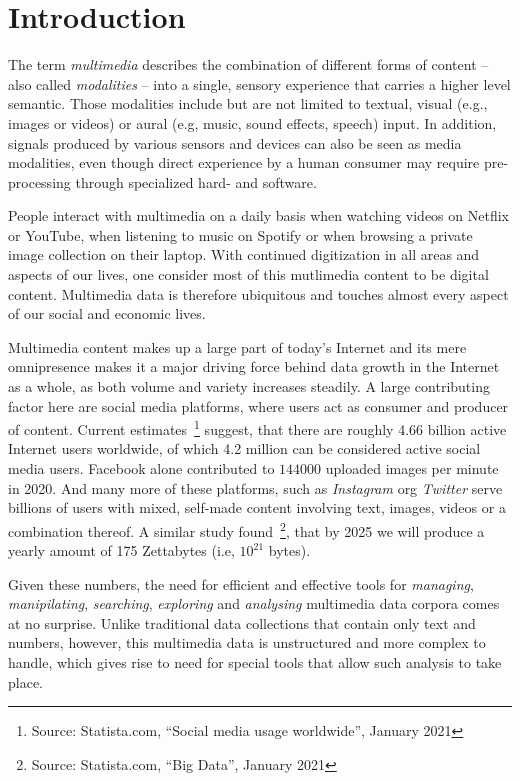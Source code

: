 \chapter{Introduction}
The term \emph{multimedia} describes the combination of different forms of content -- also called \emph{modalities} -- into a single, sensory experience that carries a higher level semantic. Those modalities include but are not limited to textual, visual (e.g., images or videos) or aural (e.g, music, sound effects, speech) input. In addition, signals produced by various sensors and devices can also be seen as media modalities, even though direct experience by a human consumer may require pre-processing through specialized hard- and software.

People interact with multimedia on a daily basis when watching videos on Netflix or YouTube, when listening to music on Spotify or when browsing a private image collection on their laptop. With continued digitization in all areas and aspects of our lives, one consider most of this mutlimedia content to be digital content. Multimedia data is therefore ubiquitous and touches almost every aspect of our social and economic lives. 

Multimedia content makes up a large part of today's Internet and its mere omnipresence makes it a major driving force behind data growth in the Internet as a whole, as both volume and variety increases steadily. A large contributing factor here are social media platforms, where users act as consumer and producer of content. Current estimates~\footnote{Source: Statista.com, ``Social media usage worldwide'', January 2021} suggest, that there are roughly 4.66 billion active Internet users worldwide, of which 4.2 million can be considered active social media users. Facebook alone contributed to $144000$ uploaded images per minute in 2020. And many more of these  platforms, such as \emph{Instagram} org \emph{Twitter} serve billions of users with mixed, self-made content involving text, images, videos or a combination thereof. A similar study found~\footnote{Source: Statista.com, ``Big Data'', January 2021}, that by 2025 we will produce a yearly amount of 175 Zettabytes (i.e, $10^{21}$ bytes).

Given these numbers, the need for efficient and effective tools for \emph{managing}, \emph{manipilating}, \emph{searching}, \emph{exploring} and \emph{analysing} multimedia data corpora comes at no surprise. Unlike traditional data collections that contain only text and numbers, however, this multimedia data is unstructured and more complex to handle, which gives rise to need for special tools that allow such analysis to take place.

